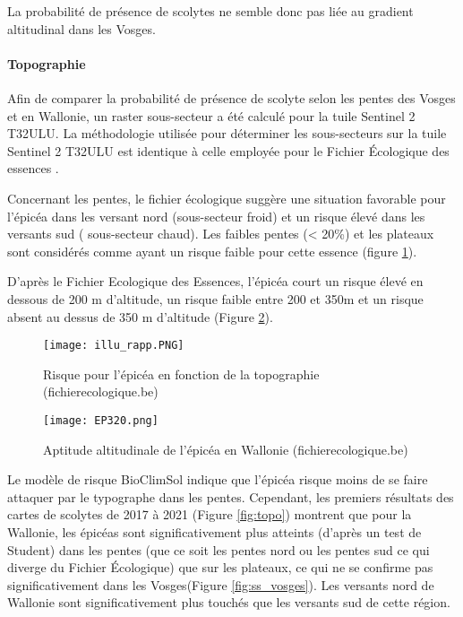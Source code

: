 La probabilité de présence de scolytes ne semble donc pas liée au gradient altitudinal dans les Vosges.


\paragraph{Topographie}
Afin de comparer la probabilité de présence de scolyte selon les pentes des Vosges et en Wallonie, un raster sous-secteur a été calculé pour la tuile Sentinel 2 T32ULU. La méthodologie utilisée pour déterminer les sous-secteurs sur la tuile Sentinel 2 T32ULU est identique à celle employée pour le Fichier Écologique des essences \citep{wampach_cartographie_2017}.

Concernant les pentes, le fichier écologique suggère une situation favorable pour l'épicéa dans les versant nord (sous-secteur froid) et un risque élevé dans les versants sud ( sous-secteur chaud). Les faibles pentes (< 20\%) et les plateaux sont considérés comme ayant un risque faible pour cette essence (figure \ref{fig:ficheco}).

D'après le Fichier Ecologique des Essences, l'épicéa court un risque élevé en dessous de 200 m d'altitude, un risque faible entre 200 et 350m et un risque absent au dessus de 350 m d'altitude (Figure \ref{fig:fichalti}).  

\begin{figure} [htbp] 
	\centering
	\texttt{[image: illu\_rapp.PNG]}
	\caption{Risque pour l'épicéa en fonction de la topographie (fichierecologique.be)}
	\label{fig:ficheco}
\end{figure}

\begin{figure} [htbp] 
	\centering
	\texttt{[image: EP320.png]}
	\caption{Aptitude altitudinale de l'épicéa en Wallonie (fichierecologique.be)}
	\label{fig:fichalti}
\end{figure}

Le modèle de risque BioClimSol indique que l'épicéa risque moins de se faire attaquer par le typographe  dans les pentes.
Cependant, les premiers résultats des cartes de scolytes de 2017 à 2021 (Figure \ref{fig:topo}) montrent que pour la Wallonie, les épicéas sont significativement plus atteints (d'après un test de Student) dans les pentes (que ce soit les pentes nord ou les pentes sud ce qui diverge du Fichier Écologique) que sur les plateaux, ce qui ne se confirme pas significativement dans les Vosges(Figure \ref{fig:ss_vosges}).
Les versants nord de Wallonie sont significativement plus touchés que les versants sud de cette région. 

